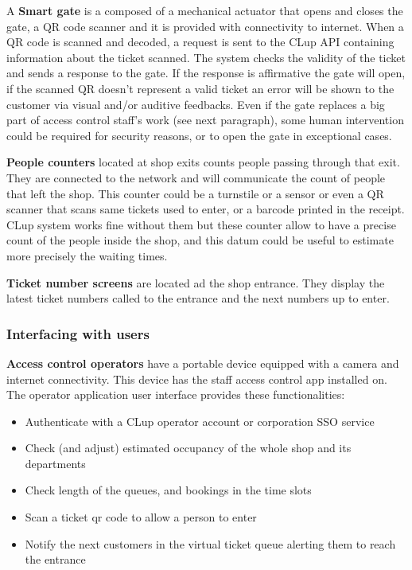 A \textbf{Smart gate} is a composed of a mechanical actuator that opens and closes the gate, a QR code scanner and it is provided with connectivity to internet. When a QR code is scanned and decoded, a request is sent to the CLup API containing information about the ticket scanned.
The system checks the validity of the ticket and sends a response to the gate. If the response is affirmative the gate will open, if the scanned QR doesn't represent a valid ticket an error will be shown to the customer via visual and/or auditive feedbacks. Even if the gate replaces a big part of access control staff's work (see next paragraph), some human intervention could be required for security reasons, or to open the gate in exceptional cases. 


\textbf{People counters} located at shop exits counts people passing through that exit. They are connected to the network and will communicate the count of people that left the shop. This counter could be a turnstile or a sensor or even a QR scanner that scans same tickets used to enter, or a barcode printed in the receipt. CLup system works fine without them but these counter allow to have a precise count of the people inside the shop, and this datum could be useful to estimate more precisely the waiting times.

\textbf{Ticket number screens} are located ad the shop entrance. They display the latest ticket numbers called to the entrance and the next numbers up to enter.

\subsubsection{Interfacing with users}

\textbf{Access control operators} have a portable device equipped with a camera and internet connectivity. This device has the staff access control app installed on. The operator application user interface provides these functionalities:
\begin{itemize}
    \item Authenticate with a CLup operator account or corporation SSO service
    \item Check (and adjust) estimated occupancy of the whole shop and its departments
    \item Check length of the queues, and bookings in the time slots
    \item Scan a ticket qr code to allow a person to enter
    \item Notify the next customers in the virtual ticket queue alerting them to reach the entrance
\end{itemize}

